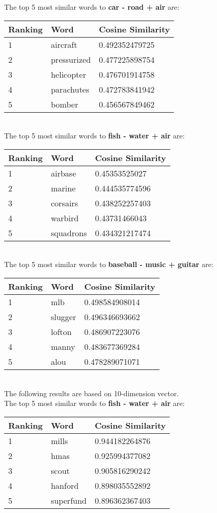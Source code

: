\documentclass{article}
\begin{document}
The top 5 most similar words to \textbf{car - road + air} are:\\
\begin{tabular}{ p{2.5cm}|p{2.5cm}|p{3cm}  }
 \hline
 Ranking & Word & Cosine Similarity\\
 \hline
1 & aircraft & 0.492352479725\\
2 & pressurized & 0.477225898754\\
3 & helicopter & 0.476701914758\\
4 & parachutes & 0.472783841942\\
5 & bomber & 0.456567849462\\
 \hline
\end{tabular}\\

The top 5 most similar words to \textbf{fish - water + air} are:\\
\begin{tabular}{ p{2.5cm}|p{2.5cm}|p{3cm}  }
 \hline
 Ranking & Word & Cosine Similarity\\
 \hline
1 & airbase & 0.45353525027\\
2 & marine & 0.444535774596\\
3 & corsairs & 0.438252257403\\
4 & warbird & 0.43731466043\\
5 & squadrons & 0.434321217474\\
 \hline
\end{tabular}\\

The top 5 most similar words to \textbf{baseball - music + guitar} are:\\
\begin{tabular}{ p{2.5cm}|p{2.5cm}|p{3cm}  }
 \hline
 Ranking & Word & Cosine Similarity\\
 \hline
1 & mlb & 0.498584908014\\
2 & slugger & 0.496346693662\\
3 & lofton & 0.486907223076\\
4 & manny & 0.483677369284\\
5 & alou & 0.478289071071\\
 \hline
\end{tabular}\\

\noindent
The following results are based on 10-dimension vector.\\

The top 5 most similar words to \textbf{fish - water + air} are:\\
\begin{tabular}{ p{2.5cm}|p{2.5cm}|p{3cm}  }
 \hline
 Ranking & Word & Cosine Similarity\\
 \hline
1 & mills & 0.944182264876\\
2 & hmas & 0.925994377082\\
3 & scout & 0.905816290242\\
4 & hanford & 0.898035552892\\
5 & superfund & 0.896362367403\\
 \hline
\end{tabular}\\
\end{document}
